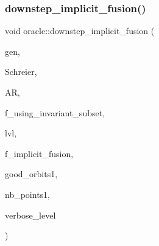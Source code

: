 \mbox{\label{classoracle_ae005e5c6d24107f3ca3462ffb94e379e}} 
\subsubsection{\texorpdfstring{downstep\+\_\+implicit\+\_\+fusion()}{downstep\_implicit\_fusion()}}
{\footnotesize\ttfamily void oracle\+::downstep\+\_\+implicit\+\_\+fusion (\begin{DoxyParamCaption}\item[{\mbox{\hyperlink{classgenerator}{generator}} $\ast$}]{gen,  }\item[{\mbox{\hyperlink{classschreier}{schreier}} \&}]{Schreier,  }\item[{\mbox{\hyperlink{classaction}{action}} \&}]{AR,  }\item[{\mbox{\hyperlink{galois_8h_a09fddde158a3a20bd2dcadb609de11dc}{I\+NT}}}]{f\+\_\+using\+\_\+invariant\+\_\+subset,  }\item[{\mbox{\hyperlink{galois_8h_a09fddde158a3a20bd2dcadb609de11dc}{I\+NT}}}]{lvl,  }\item[{\mbox{\hyperlink{galois_8h_a09fddde158a3a20bd2dcadb609de11dc}{I\+NT}}}]{f\+\_\+implicit\+\_\+fusion,  }\item[{\mbox{\hyperlink{galois_8h_a09fddde158a3a20bd2dcadb609de11dc}{I\+NT}}}]{good\+\_\+orbits1,  }\item[{\mbox{\hyperlink{galois_8h_a09fddde158a3a20bd2dcadb609de11dc}{I\+NT}}}]{nb\+\_\+points1,  }\item[{\mbox{\hyperlink{galois_8h_a09fddde158a3a20bd2dcadb609de11dc}{I\+NT}}}]{verbose\+\_\+level }\end{DoxyParamCaption})}

\mbox{\label{classoracle_a140c3df3ca2f645e364b5cd644c088ab}} 
